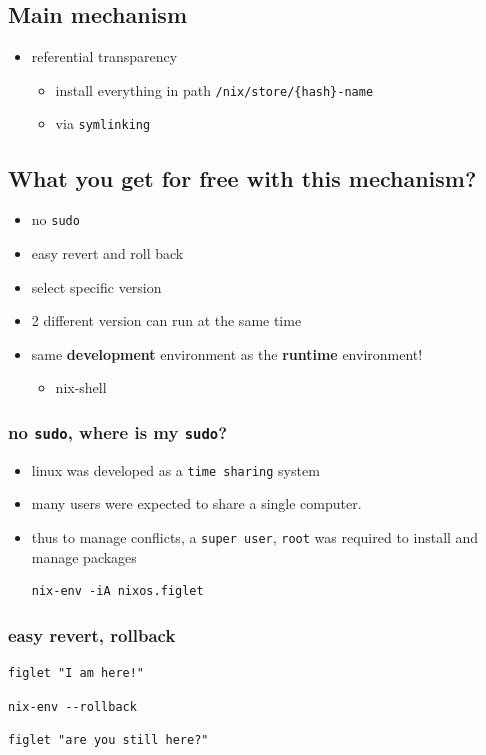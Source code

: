 \documentclass[11pt]{article}
\begin{document}
\subsection{Main mechanism}
\label{sec:orgfa3797f}
\begin{itemize}
\item referential transparency
\begin{itemize}
\item install everything in path \texttt{/nix/store/\{hash\}-name}
\item via \texttt{symlinking}
\end{itemize}
\end{itemize}
\subsection{What you get for free with this mechanism?}
\label{sec:org6875ffc}
\begin{itemize}
\item no \texttt{sudo}
\item easy revert and roll back
\item select specific version
\item 2 different version can run at the same time
\item same \textbf{development} environment as the \textbf{runtime} environment!
\begin{itemize}
\item nix-shell
\end{itemize}
\end{itemize}
\subsubsection{no \texttt{sudo}, where is my \texttt{sudo}?}
\label{sec:org2d426f9}
\begin{itemize}
\item linux was developed as a \texttt{time sharing} system
\item many users were expected to share a single computer.
\item thus to manage conflicts, a \texttt{super user}, \texttt{root} was required to
install and manage packages
\begin{verbatim}
nix-env -iA nixos.figlet
\end{verbatim}
\end{itemize}
\subsubsection{easy revert, rollback}
\label{sec:orgc5aaae3}
\begin{verbatim}
figlet "I am here!"
\end{verbatim}
\begin{verbatim}
nix-env --rollback
\end{verbatim}
\begin{verbatim}
figlet "are you still here?"
\end{verbatim}
\end{document}
